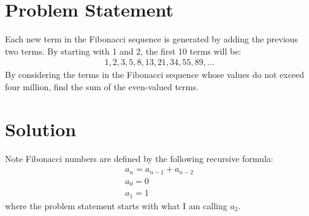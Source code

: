 \documentclass{article}
\begin{document}
\section*{Problem Statement}
Each new term in the Fibonacci sequence is generated by adding the previous two terms. By starting with 1 and 2, the first 10 terms will be:
\begin{gather*}
	1, 2, 3, 5, 8, 13, 21, 34, 55, 89, ...
\end{gather*}
\noindent By considering the terms in the Fibonacci sequence whose values do not exceed four million, find the sum of the even-valued terms.
\section*{Solution}
Note Fibonacci numbers are defined by the following recursive formula:
\begin{gather*}
	a_{n} = a_{n - 1} + a_{n - 2}\\
	a_{0} = 0\\
	a_{1} = 1
\end{gather*}
where the problem statement starts with what I am calling $a_{2}$.
\end{document}
